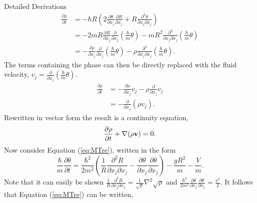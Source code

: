 \begin{chapter}{Detailed Derivations\label{app:App2}}
\begin{align*}
  \frac{\partial \rho}{\partial t} &= -\hbar R\left( 2 \frac{\partial \theta}{\partial x_j} \frac{\partial R}{\partial x_j} + R \frac{\partial^2 \theta}{\partial x_j\partial x_j} \right)\\
  &= -2mR\frac{\partial R}{\partial x_j}\frac{\partial}{\partial x_j}\left( \frac{\hbar}{m} \theta \right) - mR^2 \frac{\partial^2}{\partial x_j \partial x_j}\left(\frac{\hbar}{m}\theta \right)\\
  &= -\frac{\partial \rho}{\partial x_j}\frac{\partial}{\partial x_j}\left( \frac{\hbar}{m} \theta \right) - \rho \frac{\partial^2}{\partial x_j \partial x_j}\left(\frac{\hbar}{m}\theta \right).
\end{align*}
The terms containing the phase can then be directly replaced with the fluid velocity, $v_j = \frac{\partial}{\partial x_j}\left( \frac{\hbar}{m} \theta \right)$.
\begin{align*}
  \frac{\partial \rho}{\partial t} &= -\frac{\partial \rho}{\partial x_j} v_j - \rho \frac{\partial}{\partial x_j} v_j\\
                   &= -\frac{\partial}{\partial x_j} \left( \rho v_j \right).
\end{align*}
Rewritten in vector form the result is a continuity equation,
\begin{equation}
  \frac{\partial \rho}{\partial t} + \nabla(\rho{\bf v}) = 0.
\end{equation}
Now consider Equation (\ref{eq:MTre}), written in the form
\begin{equation*}
\frac{\hbar}{m} \frac{\partial \theta}{\partial t} = \frac{\hbar^2}{2m^2} \left( \frac{1}{R} \frac{\partial^2 R}{\partial x_j \partial x_j} - \frac{\partial \theta}{\partial x_j}\frac{\partial \theta}{\partial x_j}  \right) - \frac{gR^2}{m} - \frac{V}{m}.
\end{equation*}
Note that it can easily be shown $\frac{1}{R} \frac{\partial^2 R}{\partial x_j \partial x_j} = \frac{1}{\sqrt{\rho}}\nabla^2\sqrt{\rho}$ and $\frac{\hbar^2}{2m^2} \frac{\partial \theta}{\partial x_j}\frac{\partial \theta}{\partial x_j} = \frac{v^2}{2} $. It follows that Equation (\ref{eq:MTre}) can be written,


\end{chapter}
